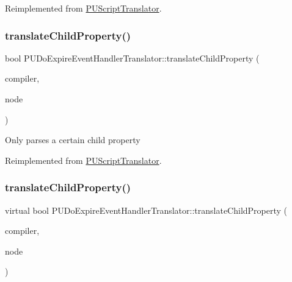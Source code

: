 Reimplemented from \hyperlink{classPUScriptTranslator_ab587d01348ae3e678cb700c719b2b113}{P\+U\+Script\+Translator}.

\mbox{\label{classPUDoExpireEventHandlerTranslator_a10c6c6f6fec3c746397e26244fc578a9}} 
\subsubsection{\texorpdfstring{translate\+Child\+Property()}{translateChildProperty()}\hspace{0.1cm}{\footnotesize\ttfamily [1/2]}}
{\footnotesize\ttfamily bool P\+U\+Do\+Expire\+Event\+Handler\+Translator\+::translate\+Child\+Property (\begin{DoxyParamCaption}\item[{\hyperlink{classPUScriptCompiler}{P\+U\+Script\+Compiler} $\ast$}]{compiler,  }\item[{\hyperlink{classPUAbstractNode}{P\+U\+Abstract\+Node} $\ast$}]{node }\end{DoxyParamCaption})\hspace{0.3cm}{\ttfamily [virtual]}}

Only parses a certain child property 

Reimplemented from \hyperlink{classPUScriptTranslator_a0374d83a8a04e57918975d525e0f8fe8}{P\+U\+Script\+Translator}.

\mbox{\label{classPUDoExpireEventHandlerTranslator_a302f9e9d698e40a8a3ea255644710b02}} 
\subsubsection{\texorpdfstring{translate\+Child\+Property()}{translateChildProperty()}\hspace{0.1cm}{\footnotesize\ttfamily [2/2]}}
{\footnotesize\ttfamily virtual bool P\+U\+Do\+Expire\+Event\+Handler\+Translator\+::translate\+Child\+Property (\begin{DoxyParamCaption}\item[{\hyperlink{classPUScriptCompiler}{P\+U\+Script\+Compiler} $\ast$}]{compiler,  }\item[{\hyperlink{classPUAbstractNode}{P\+U\+Abstract\+Node} $\ast$}]{node }\end{DoxyParamCaption})\hspace{0.3cm}{\ttfamily [virtual]}}

